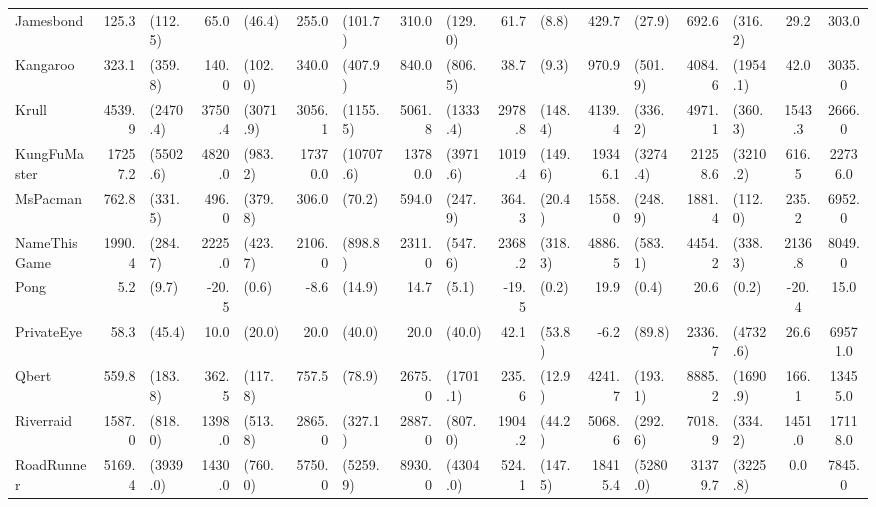 \begin{landscape}
\begin{changemargin}{0cm}{0cm}
\begin{center}
\begin{table}[!htbp]
\begin{tabular}{l|rl|rl|rl|rl|rl|rl|rl|c|c}
Jamesbond      &    125.3 &    (112.5) &     65.0 &    (46.4) &      255.0 &      (101.7) &    310.0 &    (129.0) &     61.7 &    (8.8) &    429.7 &     (27.9) &     692.6 &    (316.2) &     29.2 &    303.0 \\
Kangaroo       &    323.1 &    (359.8) &    140.0 &   (102.0) &      340.0 &      (407.9) &    840.0 &    (806.5) &     38.7 &    (9.3) &    970.9 &    (501.9) &    4084.6 &   (1954.1) &     42.0 &   3035.0 \\
Krull          &   4539.9 &   (2470.4) &   3750.4 &  (3071.9) &     3056.1 &     (1155.5) &   5061.8 &   (1333.4) &   2978.8 &  (148.4) &   4139.4 &    (336.2) &    4971.1 &    (360.3) &   1543.3 &   2666.0 \\
KungFuMaster   &  17257.2 &   (5502.6) &   4820.0 &   (983.2) &    17370.0 &    (10707.6) &  13780.0 &   (3971.6) &   1019.4 &  (149.6) &  19346.1 &   (3274.4) &   21258.6 &   (3210.2) &    616.5 &  22736.0 \\
MsPacman       &    762.8 &    (331.5) &    496.0 &   (379.8) &      306.0 &       (70.2) &    594.0 &    (247.9) &    364.3 &   (20.4) &   1558.0 &    (248.9) &    1881.4 &    (112.0) &    235.2 &   6952.0 \\
NameThisGame   &   1990.4 &    (284.7) &   2225.0 &   (423.7) &     2106.0 &      (898.8) &   2311.0 &    (547.6) &   2368.2 &  (318.3) &   4886.5 &    (583.1) &    4454.2 &    (338.3) &   2136.8 &   8049.0 \\
Pong           &      5.2 &      (9.7) &    -20.5 &     (0.6) &       -8.6 &       (14.9) &     14.7 &      (5.1) &    -19.5 &    (0.2) &     19.9 &      (0.4) &      20.6 &      (0.2) &    -20.4 &     15.0 \\
PrivateEye     &     58.3 &     (45.4) &     10.0 &    (20.0) &       20.0 &       (40.0) &     20.0 &     (40.0) &     42.1 &   (53.8) &     -6.2 &     (89.8) &    2336.7 &   (4732.6) &     26.6 &  69571.0 \\
Qbert          &    559.8 &    (183.8) &    362.5 &   (117.8) &      757.5 &       (78.9) &   2675.0 &   (1701.1) &    235.6 &   (12.9) &   4241.7 &    (193.1) &    8885.2 &   (1690.9) &    166.1 &  13455.0 \\
Riverraid      &   1587.0 &    (818.0) &   1398.0 &   (513.8) &     2865.0 &      (327.1) &   2887.0 &    (807.0) &   1904.2 &   (44.2) &   5068.6 &    (292.6) &    7018.9 &    (334.2) &   1451.0 &  17118.0 \\
RoadRunner     &   5169.4 &   (3939.0) &   1430.0 &   (760.0) &     5750.0 &     (5259.9) &   8930.0 &   (4304.0) &    524.1 &  (147.5) &  18415.4 &   (5280.0) &   31379.7 &   (3225.8) &      0.0 &   7845.0 \\

\end{tabular}
\end{table}
\end{center}
\end{changemargin}
\end{landscape}
